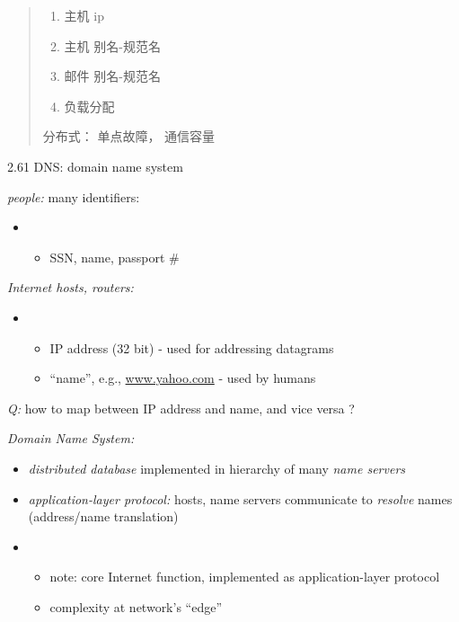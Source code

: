 \documentclass[
]{article}
\begin{document}
\begin{quote}
\begin{enumerate}
\def\labelenumi{\arabic{enumi}.}
\item
  主机 ip
\item
  主机 别名-规范名
\item
  邮件 别名-规范名
\item
  负载分配
\end{enumerate}

分布式： 单点故障， 通信容量
\end{quote}

2.61 DNS: domain name system

\emph{people:} many identifiers:

\begin{itemize}
\item
  \begin{itemize}
  \item
    SSN, name, passport \#
  \end{itemize}
\end{itemize}

\emph{Internet hosts, routers:}

\begin{itemize}
\item
  \begin{itemize}
  \item
    IP address (32 bit) - used for addressing datagrams
  \item
    ``name'', e.g., \url{www.yahoo.com} - used by humans
  \end{itemize}
\end{itemize}

\emph{Q:} how to map between IP address and name, and vice versa ?

\emph{Domain Name System:}

\begin{itemize}
\item
  \emph{distributed database} implemented in hierarchy of many
  \emph{name servers}
\item
  \emph{application-layer protocol:} hosts, name servers communicate to
  \emph{resolve} names (address/name translation)
\item
  \begin{itemize}
  \item
    note: core Internet function, implemented as application-layer
    protocol
  \item
    complexity at network's ``edge''
  \end{itemize}
\end{itemize}
\end{document}
